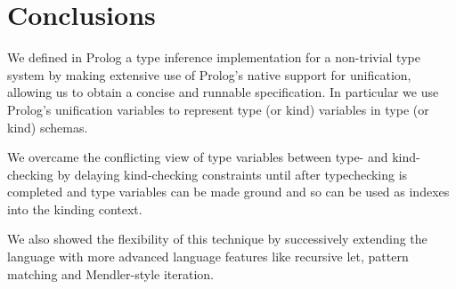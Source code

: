 \documentclass[runningheads,a4paper]{llncs}
\begin{document}
\section{Conclusions}\label{sec:concl}

We defined in Prolog a type inference implementation for a non-trivial
type system by making extensive use of Prolog's native support for
unification, allowing us to obtain a concise and runnable
specification. In particular we use Prolog's unification variables to
represent type (or kind) variables in type (or kind) schemas.

We overcame the conflicting view of type variables between type- and
kind-checking by delaying kind-checking constraints until after
typechecking is completed and type variables can be made ground and so
can be used as indexes into the kinding context.

We also showed the flexibility of this technique by successively
extending the language with more advanced language features like
recursive let, pattern matching and Mendler-style iteration.







\makeatletter
\renewcommand\bibsection{\section*\bibname}
\makeatother


\end{document}
